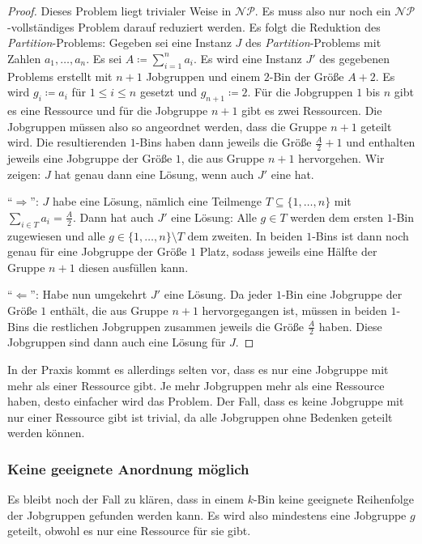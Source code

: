 \documentclass{scrreprt}
\begin{document}
\begin{proof}
    Dieses Problem liegt trivialer Weise in $\mathcal{NP}$.
    Es muss also nur noch ein $\mathcal{NP}$-vollständiges Problem darauf reduziert werden.
    Es folgt die Reduktion des \textit{Partition}-Problems:
    Gegeben sei eine Instanz $J$ des \textit{Partition}-Problems mit Zahlen $a_1,\ldots,a_n$.
    Es sei $A\coloneqq\sum_{i=1}^{n}a_i$.
    Es wird eine Instanz $J'$ des gegebenen Problems erstellt mit $n+1$ Jobgruppen und einem $2$-Bin der Größe $A+2$.
    Es wird $g_i \coloneqq a_i$ für $1\leq i\leq n$ gesetzt und $g_{n+1}\coloneqq 2$.
    Für die Jobgruppen $1$ bis $n$ gibt es eine Ressource und für die Jobgruppe $n+1$ gibt es zwei Ressourcen.
    Die Jobgruppen müssen also so angeordnet werden, dass die Gruppe $n+1$ geteilt wird.
    Die resultierenden $1$-Bins haben dann jeweils die Größe $\frac{A}{2}+1$ und enthalten jeweils eine Jobgruppe der Größe $1$, die aus Gruppe $n+1$ hervorgehen.
    Wir zeigen: $J$ hat genau dann eine Lösung, wenn auch $J'$ eine hat.

    "`$\Rightarrow$"': $J$ habe eine Lösung, nämlich eine Teilmenge $T\subseteq\{1,\ldots,n\}$ mit $\sum_{i\in T}a_i = \frac{A}{2}$.
    Dann hat auch $J'$ eine Lösung: Alle $g\in T$ werden dem ersten $1$-Bin zugewiesen und alle $g\in\{1,\ldots,n\}\setminus T$ dem zweiten.
    In beiden $1$-Bins ist dann noch genau für eine Jobgruppe der Größe $1$ Platz, sodass jeweils eine Hälfte der Gruppe $n+1$ diesen ausfüllen kann.

    "`$\Leftarrow$"': Habe nun umgekehrt $J'$ eine Lösung. Da jeder $1$-Bin eine Jobgruppe der Größe $1$ enthält, die aus Gruppe $n+1$ hervorgegangen ist,
    müssen in beiden $1$-Bins die restlichen Jobgruppen zusammen jeweils die Größe $\frac{A}{2}$ haben.
    Diese Jobgruppen sind dann auch eine Lösung für $J$.
\end{proof}

In der Praxis kommt es allerdings selten vor, dass es nur eine Jobgruppe mit mehr als einer Ressource gibt.
Je mehr Jobgruppen mehr als eine Ressource haben, desto einfacher wird das Problem.
Der Fall, dass es keine Jobgruppe mit nur einer Ressource gibt ist trivial, da alle Jobgruppen ohne Bedenken geteilt werden können.

\subsubsection{Keine geeignete Anordnung möglich}
Es bleibt noch der Fall zu klären, dass in einem $k$-Bin keine geeignete Reihenfolge der Jobgruppen gefunden werden kann.
Es wird also mindestens eine Jobgruppe $g$ geteilt, obwohl es nur eine Ressource für sie gibt.
\end{document}
